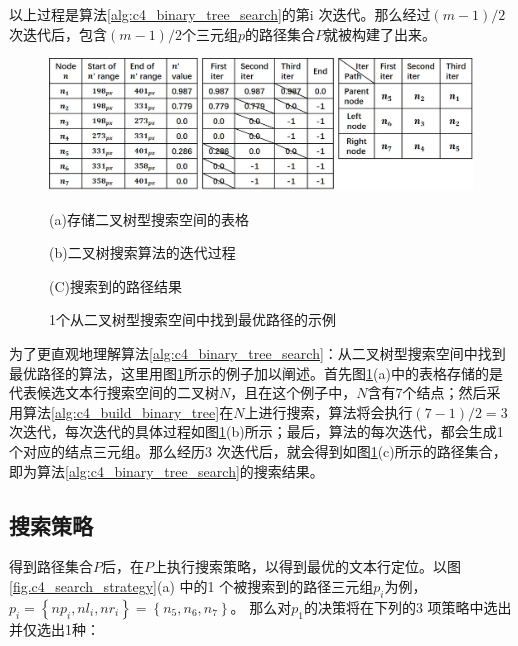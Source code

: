         以上过程是算法\ref{alg:c4_binary_tree_search}的第i 次迭代。那么经过$(m-1)/2$次迭代后，包含$(m-1)/2$个三元组$p$的路径集合$P$就被构建了出来。

        \begin{figure}[!h]
        \centering
        \includegraphics[width=\textwidth]{./figures/c4_bianry_tree_search.jpg}
        \begin{minipage}[t]{0.33\linewidth}
        \centerline{\small (a)存储二叉树型搜索空间的表格}
        \end{minipage}
        \begin{minipage}[t]{0.33\linewidth}
        \centerline{\small(b)二叉树搜索算法的迭代过程}
        \end{minipage}
        \begin{minipage}[t]{0.26\linewidth}
        \centerline{\small(C)搜索到的路径结果}
        \end{minipage}
        \caption{1个从二叉树型搜索空间中找到最优路径的示例}
        \label{fig.c4_bianry_tree_search}
        \end{figure}

        为了更直观地理解算法\ref{alg:c4_binary_tree_search}：从二叉树型搜索空间中找到最优路径的算法，这里用图\ref{fig.c4_bianry_tree_search}所示的例子加以阐述。首先图\ref{fig.c4_bianry_tree_search}(a)中的表格存储的是代表候选文本行搜索空间的二叉树$N$，且在这个例子中，$N$含有7个结点；然后采用算法\ref{alg:c4_build_binary_tree}在$N$上进行搜索，算法将会执行$(7-1)/2=3$ 次迭代，每次迭代的具体过程如图\ref{fig.c4_bianry_tree_search}(b)所示；最后，算法的每次迭代，都会生成1个对应的结点三元组。那么经历3 次迭代后，就会得到如图\ref{fig.c4_bianry_tree_search}(c)所示的路径集合，即为算法\ref{alg:c4_binary_tree_search}的搜索结果。

        \subsection{搜索策略}

        得到路径集合$P$后，在$P$上执行搜索策略，以得到最优的文本行定位。以图\ref{fig.c4_search_strategy}(a) 中的1 个被搜索到的路径三元组$p_i$为例，$p_i=\left\{np_i,nl_i,nr_i\right\}=\left\{n_5,n_6,n_7\right\}$。 那么对$p_1$的决策将在下列的3 项策略中选出并仅选出1种：

